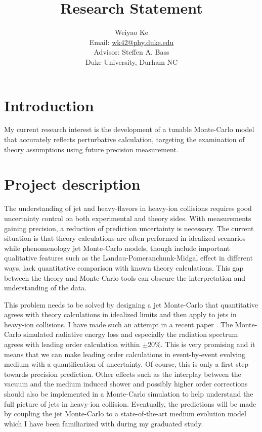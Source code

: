 \documentclass[10pt,a4paper]{article}
\title{Research Statement}
\author{Weiyao Ke \\
Email: \href{wk42@phy.duke.edu}{wk42@phy.duke.edu}\\
Advisor: Steffen A. Bass\\
Duke University, Durham NC
}
\date{}
\begin{document}
\maketitle
\section{Introduction}
My current research interest is the development of a tunable Monte-Carlo model that accurately reflects perturbative calculation, targeting the examination of theory assumptions using future precision measurement.

\section{Project description}
The understanding of jet and heavy-flavors in heavy-ion collisions requires good uncertainty control on both experimental and theory sides.
With measurements gaining precision, a reduction of prediction uncertainty is necessary.
The current situation is that theory calculations are often performed in idealized scenarios while phenomenology jet Monte-Carlo models, though include important qualitative features such as the Landau-Pomeranchunk-Midgal effect in different ways, lack quantitative comparison with known theory calculations.
This gap between the theory and Monte-Carlo tools can obscure the interpretation and understanding of the data.

This problem needs to be solved by designing a jet Monte-Carlo that quantitative agrees with theory calculations in idealized limits and then apply to jets in heavy-ion collisions.
I have made such an attempt in a recent paper \cite{}.
The Monte-Carlo simulated radiative energy loss and especially the radiation spectrum agrees with leading order calculation within $\pm 20\%$. 
This is very promising and it means that we can make leading order calculations in event-by-event evolving medium with a quantification of uncertainty.
Of course, this is only a first step towards precision prediction.
Other effects such as the interplay between the vacuum and the medium induced shower and possibly higher order corrections should also be implemented in a Monte-Carlo simulation to help understand the full picture of jets in heavy-ion collision.
Eventually, the predictions will be made by coupling the jet Monte-Carlo to a state-of-the-art medium evolution model which I have been familiarized with during my graduated study.
\end{document}
